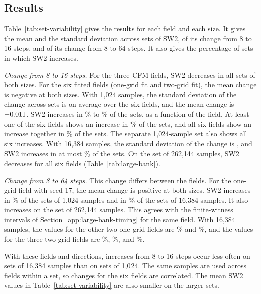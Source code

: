 \subsection{Results}
Table~\ref{tab:set-variability} gives the results for each field and
each size. It gives the mean and the standard deviation across sets of
SW2, of its change from 8 to 16 steps, and of its change from 8 to 64
steps. It also gives the percentage
of sets in which SW2 increases.

\emph{Change from 8 to 16 steps.} For the three CFM fields, SW2 decreases in all sets of both sizes. For the six fitted fields (one-grid fit and two-grid
fit), the mean change is negative at both sizes. With
1,024 samples, the standard deviation of the change across sets is
\VarSmallChangeSd{} on average over the six fields, and the mean change
is $-0.011$. SW2 increases in \VarSmallFractionMin{}\% to
\VarSmallFractionMax{}\% of the sets, as a function of the field. At
least one of the six fields shows an increase in \VarSmallAnySix{}\% of
the sets, and all six fields show an increase together in
\VarSmallAllSix{}\% of the sets. The separate 1,024-sample set also shows all six increases. With 16,384 samples, the standard deviation of the
change is \VarMediumChangeSd{}, and SW2 increases in at most
\VarMediumFractionMax{}\% of the sets. On the set of 262,144
samples, SW2 decreases for all six fields
(Table~\ref{tab:large-bank}).

\emph{Change from 8 to 64 steps.} This change differs between the
fields. For the one-grid field with seed 17, the mean change is positive at both sizes. SW2 increases in \VarSmallGridLongFraction{}\% of the
sets of 1,024 samples and in \VarMediumGridLongFraction{}\% of the sets
of 16,384 samples. It also increases on the set of 262,144
samples. This agrees with the finite-witness intervals of
Section~\ref{app:large-bank-timing} for the same field. With 16,384
samples, the values for the other two one-grid fields are
\VarMediumLongOneB{}\% and \VarMediumLongOneC{}\%, and the values for
the three two-grid fields are \VarMediumLongTwoA{}\%,
\VarMediumLongTwoB{}\%, and \VarMediumLongTwoC{}\%.

With these fields and directions, increases from 8 to 16 steps occur
less often on sets of 16,384 samples than on sets of 1,024. The same
samples are used across fields within a set, so changes for the six
fields are correlated. The mean SW2 values in
Table~\ref{tab:set-variability} are also smaller on the larger sets.

\begin{table}[ht]
\centering
\caption{Empirical SW2 of the nine two-dimensional fields on independent
evaluation sets. Entries are means across sets, with standard deviations
across sets in parentheses. The two increase columns give the percentages of sets in which SW2
increases from 8 to 16 and from 8 to 64 steps.}
\label{tab:set-variability}
\footnotesize

\end{table}
